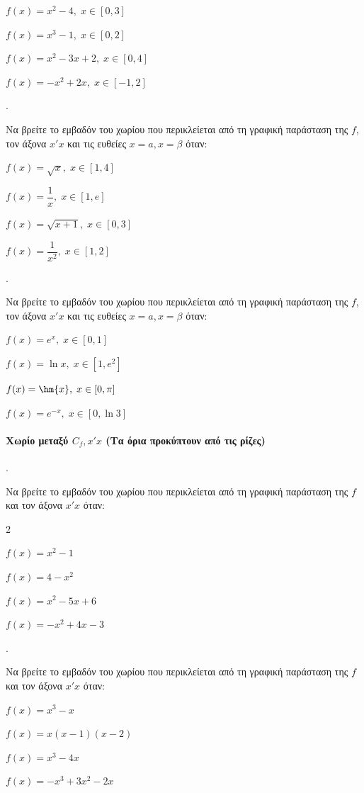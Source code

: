\documentclass[11pt,a4paper,twocolumn]{article}
\newcounter{askhsh}
\newcommand{\askhsh}{\large\theaskhsh.\ \addtocounter{askhsh}{1}}
\begin{document}
\begin{alist}
\item $f(x)=x^2-4, \; x \in [0, 3]$
\item $f(x)=x^3-1, \; x \in [0, 2]$
\item $f(x)=x^2-3x+2, \; x \in [0, 4]$
\item $f(x)=-x^2+2x, \; x \in [-1, 2]$
\end{alist}

\askhsh Να βρείτε το εμβαδόν του χωρίου που περικλείεται από τη γραφική παράσταση της $f$, τον άξονα $x'x$ και τις ευθείες $x=a, x=\beta$ όταν:

\begin{alist}
\item $f(x)=\sqrt{x}, \; x \in [1, 4]$
\item $f(x)=\dfrac{1}{x}, \; x \in [1, e]$
\item $f(x)=\sqrt{x+1}, \; x \in [0, 3]$
\item $f(x)=\dfrac{1}{x^2}, \; x \in [1, 2]$
\end{alist}

\askhsh Να βρείτε το εμβαδόν του χωρίου που περικλείεται από τη γραφική παράσταση της $f$, τον άξονα $x'x$ και τις ευθείες $x=a, x=\beta$ όταν:
\begin{alist}
\item $f(x)=e^x, \; x \in [0, 1]$
\item $f(x)=\ln{x}, \; x \in [1, e^2]$
\item $f(x)=\hm{x}, \; x \in [0, \pi]$
\item $f(x)=e^{-x}, \; x \in [0, \ln{3}]$
\end{alist}
\paragraph{Χωρίο μεταξύ $C_f,x'x$ (Τα όρια προκύπτουν από τις ρίζες)}
\askhsh Να βρείτε το εμβαδόν του χωρίου που περικλείεται από τη γραφική παράσταση της $f$ και τον άξονα $x'x$ όταν:
\begin{multicols}{2}
\begin{alist}
\item $f(x)=x^2-1$
\item $f(x)=4-x^2$
\item $f(x)=x^2-5x+6$
\item $f(x)=-x^2+4x-3$
\end{alist}
\end{multicols}
\askhsh Να βρείτε το εμβαδόν του χωρίου που περικλείεται από τη γραφική παράσταση της $f$ και τον άξονα $x'x$ όταν:
\begin{alist}
\item $f(x)=x^3-x$
\item $f(x)=x(x-1)(x-2)$
\item $f(x)=x^3-4x$
\item $f(x)=-x^3+3x^2-2x$
\end{alist}
\end{document}
